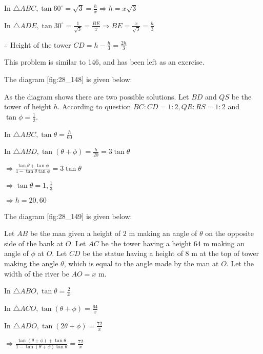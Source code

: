   In $\triangle ABC, \tan60^\circ = \sqrt{3} = \frac{h}{x} \Rightarrow h = x\sqrt{3}$

  In $\triangle ADE, \tan30^\circ = \frac{1}{\sqrt{3}} = \frac{BE}{x}\Rightarrow BE =
  \frac{x}{\sqrt{3}} = \frac{h}{3}$

  $\therefore$ Height of the tower $CD = h - \frac{h}{3} = \frac{2h}{3}$

\item This problem is similar to 146, and has been left as an exercise.

\item The diagram [fig:28_148] is given below:

  \startplacefigure[reference=fig:28_148]
    \externalfigure[28_148.pdf]
  \stopplacefigure

  As the diagram shows there are two possible solutions. Let $BD$ and $QS$ be the tower of
  height $h$. According to question $BC:CD = 1:2, QR:RS = 1:2$ and $\tan\phi =
  \frac{1}{2}$.

  In $\triangle ABC, \tan\theta = \frac{h}{60}$

  In $\triangle ABD, \tan(\theta + \phi) = \frac{h}{20} = 3\tan\theta$

  $\Rightarrow \frac{\tan\theta + \tan\phi}{1 - \tan\theta\tan\phi} = 3\tan\theta$

  $\Rightarrow \tan\theta = 1, \frac{1}{3}$

  $\Rightarrow h = 20, 60$

\item The diagram [fig:28_149] is given below:

  \startplacefigure[reference=fig:28_149]
    \externalfigure[28_149.pdf]
  \stopplacefigure

  Let $AB$ be the man given a height of $2$ m making an angle of $\theta$ on the
  opposite side of the bank at $O$. Let $AC$ be the tower having a height $64$ m
  making an angle of $\phi$ at $O$. Let $CD$ be the statue having a height of $8$
  m at the top of tower making the angle $\theta$, which is equal to the angle made by the man at
  $O$. Let the width of the river be $AO = x$ m.

  In $\triangle ABO, \tan\theta = \frac{2}{x}$

  In $\triangle ACO, \tan(\theta + \phi) = \frac{64}{x}$

  In $\triangle ADO, \tan(2\theta + \phi) = \frac{72}{x}$

  $\Rightarrow \frac{\tan(\theta + \phi) + \tan\theta}{1 - \tan(\theta + \phi)\tan\theta} =
  \frac{72}{x}$

